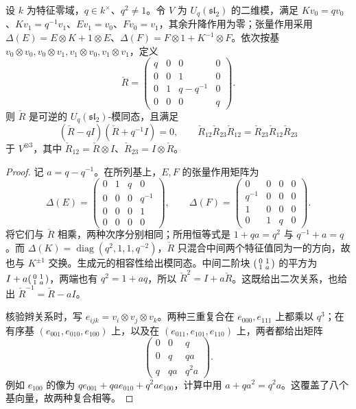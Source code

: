 \begin{proposition}\label{b5:prop:B-quantum-hecke-operator}
	设 \(k\) 为特征零域，\(q\in k^\times\)、\(q^2\ne1\)。令 \(V\) 为 \(U_q(\mathfrak{sl}_2)\) 的二维模，满足 \(Kv_0=qv_0\)、\(Kv_1=q^{-1}v_1\)、\(Ev_1=v_0\)、\(Fv_0=v_1\)，其余升降作用为零；张量作用采用 \(\Delta(E)=E\otimes K+1\otimes E\)、\(\Delta(F)=F\otimes1+K^{-1}\otimes F\)。依次按基 \(v_0\otimes v_0,v_0\otimes v_1,v_1\otimes v_0,v_1\otimes v_1\)，定义
	\[
		\check R=\begin{pmatrix}
			q&0&0&0\\
			0&0&1&0\\
			0&1&q-q^{-1}&0\\
			0&0&0&q
		\end{pmatrix}.
	\]
	则 \(\check R\) 是可逆的 \(U_q(\mathfrak{sl}_2)\)-模同态，且满足
	\[
		(\check R-qI)(\check R+q^{-1}I)=0, \qquad \check R_{12}\check R_{23}\check R_{12} =\check R_{23}\check R_{12}\check R_{23}
	\]
	于 \(V^{\otimes3}\)，其中 \(\check R_{12}=\check R\otimes I\)、\(\check R_{23}=I\otimes\check R\)。
\end{proposition}
\begin{proof}
	记 \(a=q-q^{-1}\)。在所列基上，\(E,F\) 的张量作用矩阵为
	\[
		\Delta(E)=\begin{pmatrix}0&1&q&0\\0&0&0&q^{-1}\\0&0&0&1\\0&0&0&0\end{pmatrix},
		\qquad
		\Delta(F)=\begin{pmatrix}0&0&0&0\\q^{-1}&0&0&0\\1&0&0&0\\0&1&q&0\end{pmatrix}.
	\]
	将它们与 \(\check R\) 相乘，两种次序分别相同；所用恒等式是 \(1+qa=q^2\) 与 \(q^{-1}+a=q\)。而 \(\Delta(K)=\operatorname{diag}(q^2,1,1,q^{-2})\)，\(\check R\) 只混合中间两个特征值同为一的方向，故也与 \(K^{\pm1}\) 交换。生成元的相容性给出模同态。中间二阶块 \(\begin{psmallmatrix}0&1\\1&a\end{psmallmatrix}\) 的平方为 \(I+a\begin{psmallmatrix}0&1\\1&a\end{psmallmatrix}\)，两端也有 \(q^2=1+aq\)，所以 \(\check R^2=I+a\check R\)。这既给出二次关系，也给出 \(\check R^{-1}=\check R-aI\)。

	核验辫关系时，写 \(e_{ijk}=v_i\otimes v_j\otimes v_k\)。两种三重复合在 \(e_{000},e_{111}\) 上都乘以 \(q^3\)；在有序基 \((e_{001},e_{010},e_{100})\) 上，以及在 \((e_{011},e_{101},e_{110})\) 上，两者都给出矩阵
	\[
		\begin{pmatrix}0&0&q\\0&q&qa\\q&qa&q^2a\end{pmatrix}.
	\]
	例如 \(e_{100}\) 的像为 \(qe_{001}+qae_{010}+q^2ae_{100}\)，计算中用 \(a+qa^2=q^2a\)。这覆盖了八个基向量，故两种复合相等。
\end{proof}


